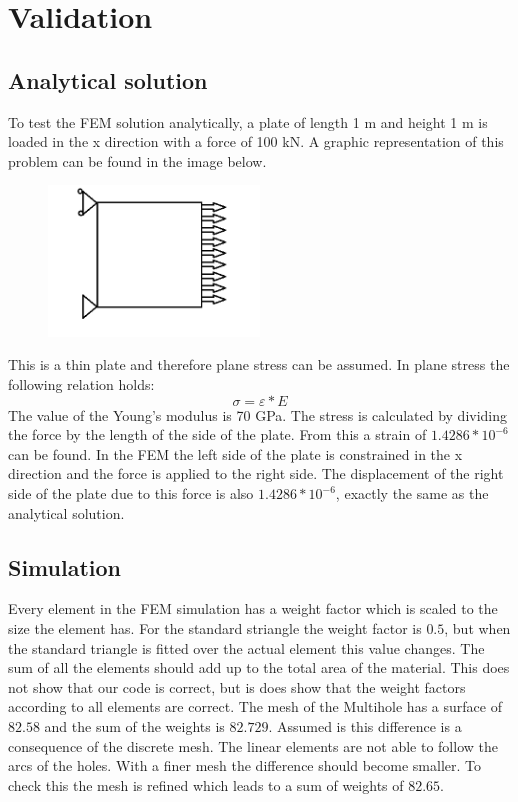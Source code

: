 \chapter{Validation}

\section{Analytical solution}
To test the FEM solution analytically, a plate of length 1 m and height 1 m is loaded in the x direction with a force of 100 kN. A graphic representation of this problem can be found in the image below.

\begin{figure}[h!]
    \parbox [t]{\textwidth}
        {
        \center
        \includegraphics[width=0.5\textwidth]{IMG/analytisch.png}
        }
\end{figure}

This is a thin plate and therefore plane stress can be assumed. In plane stress the following relation holds:
\[\sigma=\varepsilon*E\]
The value of the Young's modulus is 70 GPa. The stress is calculated by dividing the force by the length of the side of the plate. From this a strain of \(1.4286*10^{-6}\) can be found. 
In the FEM the left side of the plate is constrained in the x direction and the force is applied to the right side. The displacement of the right side of the plate due to this force is also \(1.4286*10^{-6}\), exactly the same as the analytical solution. 

\section{Simulation}
Every element in the FEM simulation has a weight factor which is scaled to the size the element has. For the standard striangle the weight factor is $0.5$, but when the standard triangle is fitted over the actual element this value changes. The sum of all the elements should add up to the total area of the material. This does not show that our code is correct, but is does show that the weight factors according to all elements are correct. The mesh of the Multihole has a surface of $82.58$ and the sum of the weights is $82.729$. Assumed is this difference is a consequence of the discrete mesh. The linear elements are not able to follow the arcs of the holes. With a finer mesh the difference should become smaller. To check this the mesh is refined which leads to a sum of weights of $82.65$.
